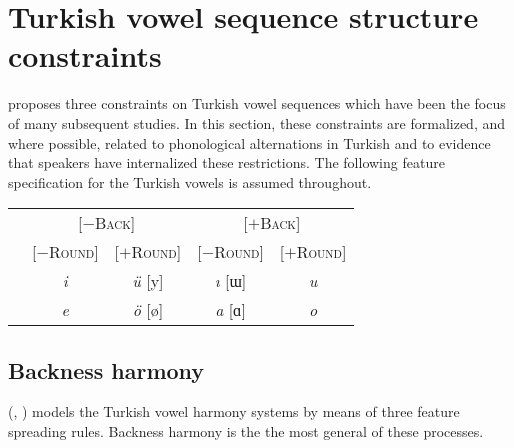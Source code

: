 

\section{Turkish vowel sequence structure constraints}

\citet{Lees1966b,Lees1966a} 
proposes three constraints on Turkish vowel sequences which have been the focus of many subsequent studies. In this section, these constraints are formalized, and where possible, related to phonological alternations in Turkish and to evidence that speakers have internalized these restrictions. The following feature specification for the Turkish vowels is assumed throughout.

\begin{example}
\begin{tabular}{c | c c c c}
                       & \multicolumn{2}{c}{[$-$\textsc{Back}]} & \multicolumn{2}{c}{[$+$\textsc{Back}]} \\
                       & [$-$\textsc{Round}] & [$+$\textsc{Round}] & [$-$\textsc{Round}] & [$+$\textsc{Round}] \\ \midrule
{} & \emph{i} & \emph{ü} [y] & \emph{ı} [ɯ] & \emph{u} \\
 & \emph{e} & \emph{ö} [ø] & \emph{a} [ɑ] & \emph{o} \\
\end{tabular}
\end{example}

\subsection{Backness harmony}

\citeauthor{Lees1966b} (\citeyear[][35]{Lees1966b}, \citeyear[][284]{Lees1966a}) models the Turkish vowel harmony systems by means of three feature spreading rules. Backness harmony is the the most general of these processes.  

